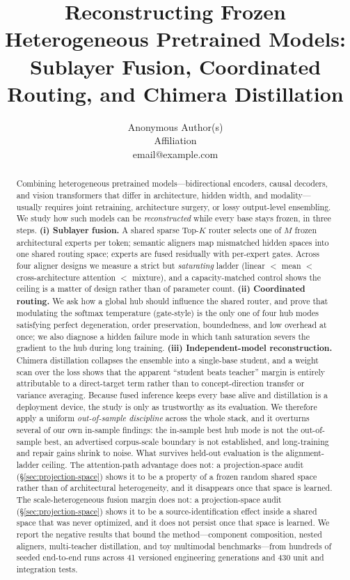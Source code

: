 \documentclass[10pt]{article}
\title{Reconstructing Frozen Heterogeneous Pretrained Models:\\
Sublayer Fusion, Coordinated Routing, and Chimera Distillation}
\author{
    \name Anonymous Author(s)\\
    \addr Affiliation\\
    \email email@example.com
}
\theoremstyle{definition}
\theoremstyle{plain}
\theoremstyle{remark}
\begin{document}
\maketitle

\begin{abstract}
Combining heterogeneous pretrained models---bidirectional encoders, causal decoders, and vision transformers that differ in architecture, hidden width, and modality---usually requires joint retraining, architecture surgery, or lossy output-level ensembling. We study how such models can be \emph{reconstructed} while every base stays frozen, in three steps. \textbf{(i) Sublayer fusion.} A shared sparse Top-$K$ router selects one of $M$ frozen architectural experts per token; semantic aligners map mismatched hidden spaces into one shared routing space; experts are fused residually with per-expert gates. Across four aligner designs we measure a strict but \emph{saturating} ladder (linear $<$ mean $<$ cross-architecture attention $<$ mixture), and a capacity-matched control shows the ceiling is a matter of design rather than of parameter count. \textbf{(ii) Coordinated routing.} We ask how a global hub should influence the shared router, and prove that modulating the softmax temperature (gate-style) is the only one of four hub modes satisfying perfect degeneration, order preservation, boundedness, and low overhead at once; we also diagnose a hidden failure mode in which tanh saturation severs the gradient to the hub during long training. \textbf{(iii) Independent-model reconstruction.} Chimera distillation collapses the ensemble into a single-base student, and a weight scan over the loss shows that the apparent ``student beats teacher'' margin is entirely attributable to a direct-target term rather than to concept-direction transfer or variance averaging. Because fused inference keeps every base alive and distillation is a deployment device, the study is only as trustworthy as its evaluation. We therefore apply a uniform \emph{out-of-sample discipline} across the whole stack, and it overturns several of our own in-sample findings: the in-sample best hub mode is not the out-of-sample best, an advertised corpus-scale boundary is not established, and long-training and repair gains shrink to noise. What survives held-out evaluation is the alignment-ladder ceiling. The attention-path advantage does not: a projection-space audit (\S\ref{sec:projection-space}) shows it to be a property of a frozen random shared space rather than of architectural heterogeneity, and it disappears once that space is learned. The scale-heterogeneous fusion margin does not: a projection-space audit (\S\ref{sec:projection-space}) shows it to be a source-identification effect inside a shared space that was never optimized, and it does not persist once that space is learned. We report the negative results that bound the method---component composition, nested aligners, multi-teacher distillation, and toy multimodal benchmarks---from hundreds of seeded end-to-end runs across 41 versioned engineering generations and 430 unit and integration tests.
\end{abstract}
\end{document}
